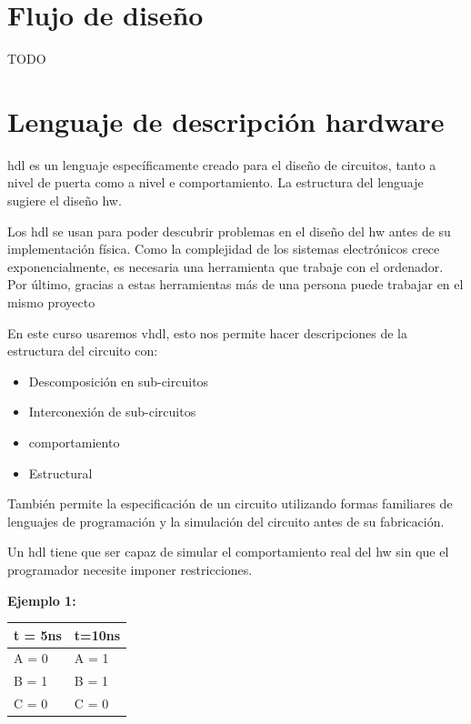 \pagestyle{fancy}
\section{Flujo de diseño}

TODO

\section{Lenguaje de descripción hardware}
\gls{hdl} es un lenguaje específicamente creado para el diseño de circuitos, tanto a nivel de puerta como a nivel e comportamiento. La estructura del lenguaje sugiere el diseño \gls{hw}.

Los \gls{hdl} se usan para poder descubrir problemas en el diseño del \gls{hw} antes de su implementación física. Como la complejidad de los sistemas electrónicos crece exponencialmente, es necesaria una herramienta que trabaje con el ordenador. Por último, gracias a estas herramientas más de una persona puede trabajar en el mismo proyecto

En este curso usaremos \gls{vhdl}, esto nos permite hacer descripciones de la estructura del circuito con:
\begin{itemize}
	\item Descomposición en sub-circuitos
	\item Interconexión de sub-circuitos
	\item comportamiento
	\item Estructural
\end{itemize}
También permite la especificación de un circuito utilizando formas familiares de lenguajes de programación y la simulación del circuito antes de su fabricación.

Un \gls{hdl} tiene que ser capaz de simular el comportamiento real del \gls{hw} sin que el programador necesite imponer restricciones.

\noindent \textbf{Ejemplo 1:}

\begin{table}[H]
	\centering
	\begin{tabular}{|l|l|}
		\hline
		\cellcolor[HTML]{70A9FC} t = 5ns & \cellcolor[HTML]{70A9FC} t=10ns \\ \hline
		A = 0                            & A = 1                           \\ \hline
		B = 1                            & B = 1                           \\ \hline
		C = 0                            & C = 0                           \\ \hline
	\end{tabular}
\end{table}

